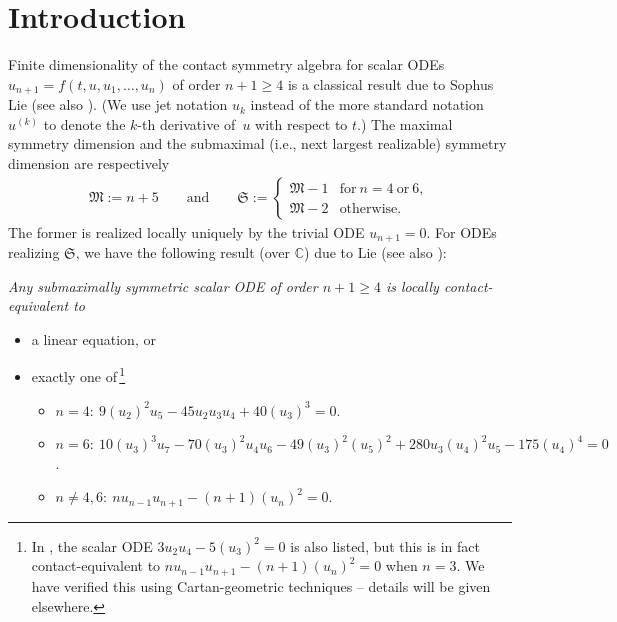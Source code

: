\documentclass[pdftex]{sigma}%
\newcommand\fM{\mathfrak{M}}
\newcommand\fS{\mathfrak{S}}
\newcommand{\C}{\mathbb{C}}
\numberwithin{equation}{section}
\begin{document}

\renewcommand{\thefootnote}{\arabic{footnote}}
\setcounter{footnote}{0}

\section{Introduction}

Finite dimensionality of the contact symmetry algebra for scalar ODEs $u_{n+1}=f(t,u,u_1,\dots,u_n)$ of order $n+1\ge 4$
is a classical result due to Sophus Lie \cite{Lie1893} (see also \cite[Theorem~6.44]{Olver1995}). (We use jet notation $u_k$ instead of the more standard notation $u^{(k)}$ to denote the $k$-th derivative of~$u$ with respect to $t$.) The maximal symmetry dimension and the submaximal (i.e., next largest realizable) symmetry dimension are respectively
\begin{align*}
\fM:=n+5 \qquad \text{and}\qquad \fS := \begin{cases}
\fM-1 & \text{for}\ n=4\ \text{or}\ 6, \\
\fM-2 & \text{otherwise}.
\end{cases}
\end{align*}
 The former is realized locally uniquely by the trivial ODE $u_{n+1} = 0$. For ODEs realizing $\fS$, we have the following result (over $\C$) due to Lie \cite{Lie1924} (see also \cite[pp.~205--206]{Olver1995}): {\em Any submaximally symmetric scalar ODE of order $n+1 \ge 4$ is locally contact-equivalent to
\begin{itemize}\itemsep=0pt
\item[$(a)$] a linear equation, or
\item[$(b)$] exactly one of\,\footnote{In \cite[p.~206]{Olver1995}, the scalar ODE $3 u_2 u_4 - 5 (u_3)^2 = 0$ is also listed, but this is in fact contact-equivalent to $n u_{n-1} u_{n+1} - (n+1) (u_n)^2 = 0$ when $n=3$. We have verified this using Cartan-geometric techniques -- details will be given elsewhere.}
\begin{itemize}\itemsep=0pt
\item[$(i)$] $n=4\colon\ 9 (u_2)^2 u_5 - 45 u_2 u_3 u_4 + 40(u_3)^3 = 0$.
\item[$(ii)$] $n=6\colon\ 10(u_{3})^3u_{7}-70(u_{3})^2u_{4}u_{6} - 49(u_{3})^2(u_{5})^2 + 280u_{3}(u_{4})^2u_{5} -175(u_{4})^4 = 0$.
\item[$(iii)$] $n \neq 4,6\colon\ n u_{n-1} u_{n+1} - (n+1) (u_n)^2 = 0$.
\end{itemize}
\end{itemize}
}
\end{document}
